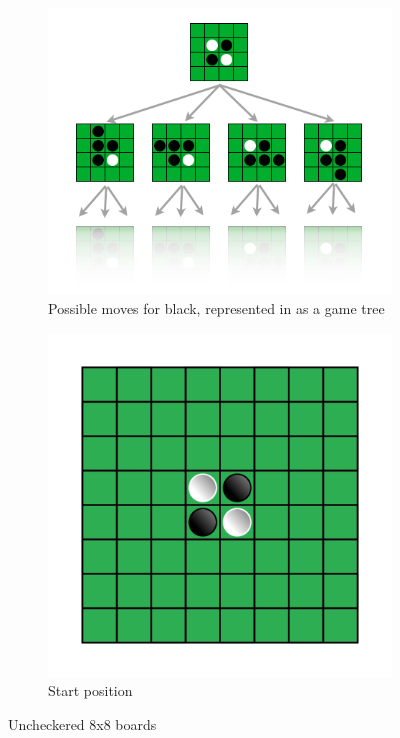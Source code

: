 \documentclass[
11pt, %
english, %
singlespacing, %
headsepline, %
]{MastersDoctoralThesis} %
\begin{document}
\begin{figure}
	\centering
	\begin{subfigure}{0.4\textwidth}
		\includegraphics[width=\textwidth]{images/othello-gametree}
		\caption{Possible moves for black, represented in as a game tree}
		\label{fig:othello-gametree}
	\end{subfigure}%
	\begin{subfigure}{.4\textwidth}
		\includegraphics[width=\textwidth]{images/startposition}
		\caption{Start position}
		\label{fig:othello-startposition}		
	\end{subfigure}
	\caption{Uncheckered 8x8 boards}
\end{figure}
\end{document}
